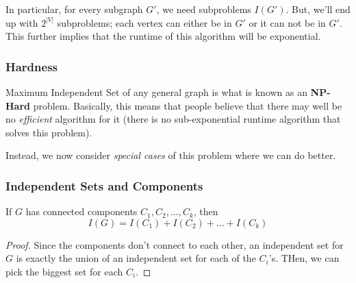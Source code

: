\documentclass[letterpaper]{article}
\begin{document}
\bigskip 

In particular, for every subgraph $G'$, we need subproblems $I(G')$. But, we'll end up with $2^{|V|}$ subproblems; each vertex can either be in $G'$ or it can not be in $G'$. This further implies that the runtime of this algorithm will be exponential. 

\subsubsection{Hardness}
Maximum Independent Set of any general graph is what is known as an \textbf{NP-Hard} problem. Basically, this means that people believe that there may well be no \emph{efficient} algorithm for it (there is no sub-exponential runtime algorithm that solves this problem). 

\bigskip 

Instead, we now consider \emph{special cases} of this problem where we can do better. 

\subsubsection{Independent Sets and Components}
\begin{lemma}{}{}
    If $G$ has connected components $C_1, C_2, \dots, C_k$, then 
    \[I(G) = I(C_1) + I(C_2) + \dots + I(C_k)\]
\end{lemma}
\begin{mdframed}[]
    \begin{proof}
        Since the components don't connect to each other, an independent set for $G$ is exactly the union of an independent set for each of the $C_i$'s. THen, we can pick the biggest set for each $C_i$. 
    \end{proof}
\end{mdframed}
\end{document}
